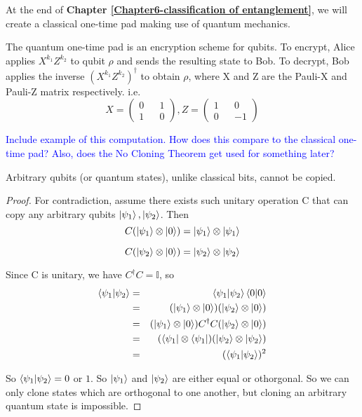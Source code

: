 At the end of \textbf{Chapter \ref{Chapter6-classification of entanglement}}, we will create a classical one-time pad making use of quantum mechanics.

\begin{definition} \label{def: quantum one-time pad}
The quantum one-time pad is an encryption scheme for qubits. To encrypt, Alice applies $X^{k_1} Z^{k_2}$ to qubit $\rho$ and sends the resulting state to Bob. To decrypt, Bob applies the inverse $(X^{k_1} Z^{k_2})^\dagger$ to obtain $\rho$, where X and Z are the Pauli-X and Pauli-Z matrix respectively. i.e.
\begin{equation}
    X=\begin{pmatrix}
    0 && 1\\
    1 && 0
    \end{pmatrix}, 
    Z=\begin{pmatrix}
    1 && 0\\
    0 && -1
    \end{pmatrix}
\end{equation}
\end{definition}

\textcolor{blue}{Include example of this computation.  How does this compare to the classical one-time pad?  Also, does the No Cloning Theorem get used for something later?}

\begin{theorem} \label{no-cloning thm}
Arbitrary qubits (or quantum states), unlike classical bits, cannot be copied. 
\end{theorem} 

\begin{proof} \cite{Wehner:notes}
For contradiction, assume there exists such unitary operation C that can copy any arbitrary qubits $\ket{\psi_1}, \ket{\psi_2}$. Then
\begin{equation*}
    C(\ket{\psi_1} \otimes \ket{0})=\ket{\psi_1} \otimes \ket{\psi_1}
\end{equation*}

\begin{equation*}
C(\ket{\psi_2} \otimes \ket{0})=\ket{\psi_2} \otimes \ket{\psi_2}  
\end{equation*}
    

Since C is unitary, we have $C^\dagger C=\mathbb{I}$, so
\begin{eqnarray*}
\braket{\psi_1|\psi_2}&=&\braket{\psi_1|\psi_2}\braket{0|0}\\
&=&(\ket{\psi_1} \otimes \ket{0})(\ket{\psi_2} \otimes \ket{0})\\
&=&(\ket{\psi_1} \otimes \ket{0})C^\dagger C(\ket{\psi_2} \otimes \ket{0})\\
&=&(\bra{\psi_1} \otimes \bra{\psi_1})(\ket{\psi_2} \otimes \ket{\psi_2})\\
&=&(\braket{\psi_1 |\psi_2})^2
\end{eqnarray*}

So $\braket{\psi_1 | \psi_2}=0$ or $1$. So $\ket{\psi_1}$ and $\ket{\psi_2}$ are either equal or othorgonal. So we can only clone states which are orthogonal to one another, but cloning an arbitrary quantum state is impossible. 
\end{proof}

